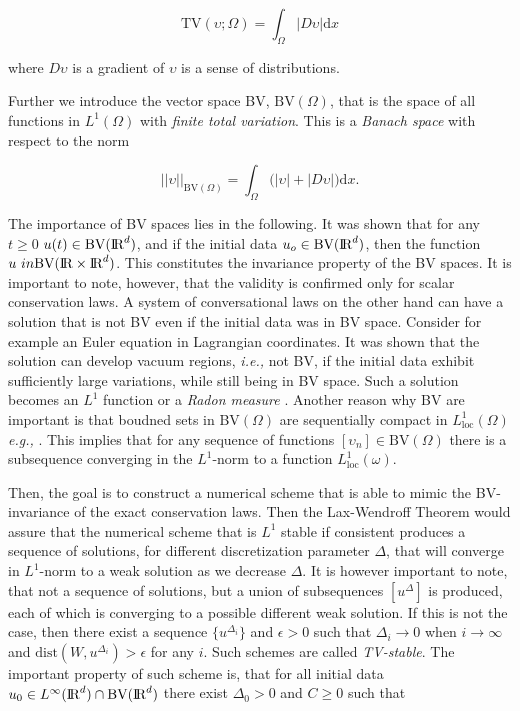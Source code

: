\begin{equation}
\text{TV}(\upsilon; \Omega) = \int_{\Omega}|D\upsilon|\text{d}x
\end{equation}

where $D\upsilon$ is a gradient of $\upsilon$ is a sense of distributions. 

Further we introduce the vector space BV, $\text{BV}(\Omega)$, that is the space of all functions in $L^1(\Omega)$ with \textit{finite total variation}. This is a \textit{Banach space} with respect to the norm 

\begin{equation}
|| \upsilon ||_{\text{BV}(\Omega)} = \int_{\Omega}\big(|\upsilon| + |D\upsilon|\big)\text{d}x.
\end{equation}

The importance of BV spaces lies in the following. 
It was shown \cite{Conway:1966} that for any $t\geq 0$ $u(t)\in \text{BV}(\text{I\!R}^d)$, and if the initial data $u_o\in \text{BV}(\text{I\!R}^d)$, then the function $u \ in \text{BV}(\text{I\!R}\times\text{I\!R}^d)$. 
This constitutes the invariance property of the BV spaces. 
It is important to note, however, that the validity is confirmed only for scalar conservation laws. 
A system of conversational laws on the other hand can have a solution that is not BV even if the initial data was in BV space. 
Consider for example an Euler equation in Lagrangian coordinates. 
It was shown that the solution can develop vacuum regions, \textit{i.e.,} not BV, if the initial data exhibit sufficiently large variations, while still being in BV space. 
Such a solution becomes an $L^1$ function or a \textit{Radon measure} \cite{Chen:2006}. 
Another reason why BV are important is that boudned sets in BV$(\Omega)$ are sequentially compact in $L^1 _{\text{loc}}(\Omega)$ \textit{e.g.,} \cite{Luigi:2002}. 
This implies that for any sequence of functions $[\upsilon_n]\in\text{BV}(\Omega)$ there is a subsequence converging in the $L^1$-norm to a function $L^1 _{\text{loc}}(\omega)$. 

Then, the goal is to construct a numerical scheme that is able to mimic the BV-invariance of the exact conservation laws. 
Then the Lax-Wendroff Theorem would assure that the numerical scheme that is $L^1$ stable if consistent produces a sequence of solutions, for different discretization parameter $\Delta$, that will converge in $L^1$-norm to a weak solution as we decrease $\Delta$. 
It is however important to note, that not a sequence of solutions, but a union of subsequences $[u^{\Delta}]$ is produced, each of which is converging to a possible different weak solution. 
If this is not the case, then there exist a sequence $\{u^{\Delta_i}\}$ and $\epsilon > 0$ such that $\Delta_i\rightarrow 0 $ when $i\rightarrow \infty$ and $\text{dist}(W,u^{\Delta_i})>\epsilon$ for any $i$. 
Such schemes are called \textit{TV-stable}. The important property of such scheme is, that for all initial data $u_0\in L^{\infty}(\text{I\!R}^d)\cap \text{BV}(\text{I\!R}^d)$ there exist $\Delta_0 > 0$ and $C\geq 0$ such that 

